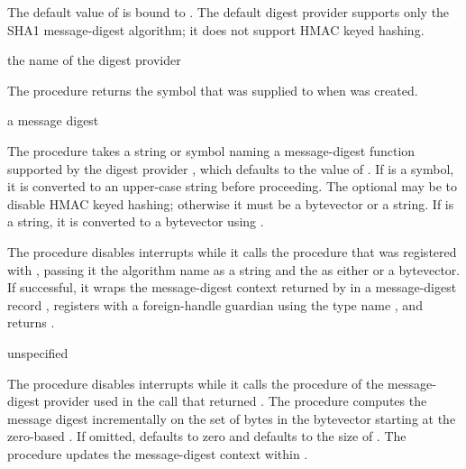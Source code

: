 The default value of  is bound to
.
The default digest provider supports only the SHA1 message-digest algorithm;
it does not support HMAC keyed hashing.

\begin{procedure}
\end{procedure}
\returns{} the name of the digest provider

The  procedure returns the symbol
that was supplied to  when 
was created.

\begin{procedure}
\end{procedure}
\returns{} a message digest

The  procedure takes a string or symbol 
naming a message-digest function supported by the digest provider
, which defaults to the value of .
If  is a symbol, it is converted to an upper-case string
before proceeding.
The optional  may be  to disable HMAC keyed
hashing; otherwise it must be a bytevector or a string.
If  is a string, it is converted to a bytevector
using .

The  procedure disables interrupts while it calls the 
procedure that was registered with , passing it the
algorithm name as a string and the  as either  or a
bytevector.
If successful, it wraps the message-digest context returned by 
in a message-digest record , registers 
with a foreign-handle guardian using the type name ,
and returns .

\begin{procedure}
\end{procedure}
\returns{} unspecified

The  procedure disables interrupts while it calls the 
procedure of the message-digest provider used in the 
call that returned .
The  procedure computes the message digest incrementally
on the set of  bytes in the bytevector  starting at
the zero-based .
If omitted,  defaults to zero and  defaults
to the size of .
The  procedure updates the message-digest context within .

